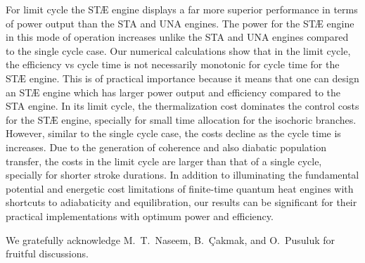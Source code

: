 \documentclass[aps,pra,twocolumn,showpacs,showkeys,groupedaddress,nobalancelastpage,nofootinbib,floatfix,superscriptaddress,longbibliography]{revtex4-2}
\begin{document}
For limit cycle the ST{\AE} engine displays a far more superior performance in terms of power output than the STA and UNA engines. The power for the ST{\AE} engine in this mode of operation increases unlike the STA and UNA engines compared to the single cycle case. Our numerical calculations show that in the limit cycle, the efficiency vs cycle time is not necessarily monotonic for cycle time for the ST{\AE}
engine. This is of practical importance because it means that one can design an ST{\AE} engine which has larger power output and efficiency compared to the STA engine. In its limit cycle, the thermalization cost dominates the control costs for the ST{\AE} engine, specially for small time allocation for the isochoric branches. However, similar to the single cycle case, the costs decline as the cycle time is increases. Due to the generation of coherence and also diabatic population transfer, the costs in the limit cycle are larger than that of a single cycle, specially for shorter stroke durations. In addition to illuminating the fundamental potential and energetic cost limitations of finite-time quantum heat engines with shortcuts to adiabaticity and equilibration, our results can be significant for their practical implementations with optimum power and efficiency.

\acknowledgements

We gratefully acknowledge M.~T.~Naseem, B.~Çakmak, and O.~Pusuluk for fruitful discussions.

\nocite{*}
%
%

\end{document}
